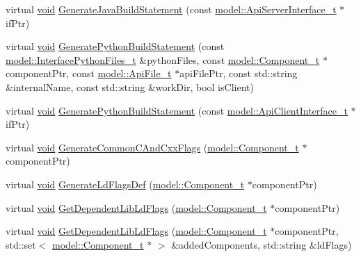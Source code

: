 \begin{DoxyCompactItemize}
\item 
virtual \hyperlink{_t_e_m_p_l_a_t_e__cdef_8h_ac9c84fa68bbad002983e35ce3663c686}{void} \hyperlink{classninja_1_1_component_build_script_generator__t_a543b5fcf1554a831d19d38d561fd1784}{Generate\+Java\+Build\+Statement} (const \hyperlink{structmodel_1_1_api_server_interface__t}{model\+::\+Api\+Server\+Interface\+\_\+t} $\ast$if\+Ptr)
\item 
virtual \hyperlink{_t_e_m_p_l_a_t_e__cdef_8h_ac9c84fa68bbad002983e35ce3663c686}{void} \hyperlink{classninja_1_1_component_build_script_generator__t_a7b95d8edd4cc9b8f4c7fb21469474e26}{Generate\+Python\+Build\+Statement} (const \hyperlink{structmodel_1_1_interface_python_files__t}{model\+::\+Interface\+Python\+Files\+\_\+t} \&python\+Files, const \hyperlink{structmodel_1_1_component__t}{model\+::\+Component\+\_\+t} $\ast$component\+Ptr, const \hyperlink{structmodel_1_1_api_file__t}{model\+::\+Api\+File\+\_\+t} $\ast$api\+File\+Ptr, const std\+::string \&internal\+Name, const std\+::string \&work\+Dir, bool is\+Client)
\item 
virtual \hyperlink{_t_e_m_p_l_a_t_e__cdef_8h_ac9c84fa68bbad002983e35ce3663c686}{void} \hyperlink{classninja_1_1_component_build_script_generator__t_af9c8443dabe907c1108c9e948fe83041}{Generate\+Python\+Build\+Statement} (const \hyperlink{structmodel_1_1_api_client_interface__t}{model\+::\+Api\+Client\+Interface\+\_\+t} $\ast$if\+Ptr)
\item 
virtual \hyperlink{_t_e_m_p_l_a_t_e__cdef_8h_ac9c84fa68bbad002983e35ce3663c686}{void} \hyperlink{classninja_1_1_component_build_script_generator__t_af88b55a40fae3cfc6c9ab84896a9d290}{Generate\+Common\+C\+And\+Cxx\+Flags} (\hyperlink{structmodel_1_1_component__t}{model\+::\+Component\+\_\+t} $\ast$component\+Ptr)
\item 
virtual \hyperlink{_t_e_m_p_l_a_t_e__cdef_8h_ac9c84fa68bbad002983e35ce3663c686}{void} \hyperlink{classninja_1_1_component_build_script_generator__t_aa56dbcadf7fc021e98c3eac8a8bb5831}{Generate\+Ld\+Flags\+Def} (\hyperlink{structmodel_1_1_component__t}{model\+::\+Component\+\_\+t} $\ast$component\+Ptr)
\item 
virtual \hyperlink{_t_e_m_p_l_a_t_e__cdef_8h_ac9c84fa68bbad002983e35ce3663c686}{void} \hyperlink{classninja_1_1_component_build_script_generator__t_a7969f116c95412cf5691640fc1ad8e02}{Get\+Dependent\+Lib\+Ld\+Flags} (\hyperlink{structmodel_1_1_component__t}{model\+::\+Component\+\_\+t} $\ast$component\+Ptr)
\item 
virtual \hyperlink{_t_e_m_p_l_a_t_e__cdef_8h_ac9c84fa68bbad002983e35ce3663c686}{void} \hyperlink{classninja_1_1_component_build_script_generator__t_a71bcd1c4db7088cacba06aa04609e9c4}{Get\+Dependent\+Lib\+Ld\+Flags} (\hyperlink{structmodel_1_1_component__t}{model\+::\+Component\+\_\+t} $\ast$component\+Ptr, std\+::set$<$ \hyperlink{structmodel_1_1_component__t}{model\+::\+Component\+\_\+t} $\ast$ $>$ \&added\+Components, std\+::string \&ld\+Flags)

\end{DoxyCompactItemize}
